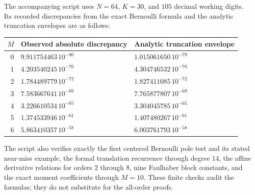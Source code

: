 \documentclass[11pt]{article}
\numberwithin{equation}{section}
\theoremstyle{definition}
\theoremstyle{remark}
\begin{document}
The accompanying script uses $N=64$, $K=30$, and $105$ decimal
working digits. Its recorded discrepancies from the exact Bernoulli
formula and the analytic truncation envelopes are as follows:
\begin{center}
\begin{tabular}{rll}
\hline
$M$ & Observed absolute discrepancy & Analytic truncation envelope\\
\hline
0 & $9.911754463\,10^{-80}$ & $1.015061650\,10^{-79}$\\
1 & $4.203540245\,10^{-76}$ & $4.304746532\,10^{-76}$\\
2 & $1.784489779\,10^{-72}$ & $1.827411085\,10^{-72}$\\
3 & $7.583667641\,10^{-69}$ & $7.765877807\,10^{-69}$\\
4 & $3.226610534\,10^{-65}$ & $3.304045785\,10^{-65}$\\
5 & $1.374533946\,10^{-61}$ & $1.407480267\,10^{-61}$\\
6 & $5.863410357\,10^{-58}$ & $6.003761793\,10^{-58}$\\
\hline
\end{tabular}
\end{center}
The script also verifies exactly the first centered Bernoulli pole
test and its stated near-miss example, the formal translation recurrence
through degree $14$, the affine derivative relations for orders $2$
through $8$, nine Faulhaber block constants, and the exact moment
coefficients through $M=10$. These finite checks audit the formulas;
they do not substitute for the all-order proofs.

\end{document}
